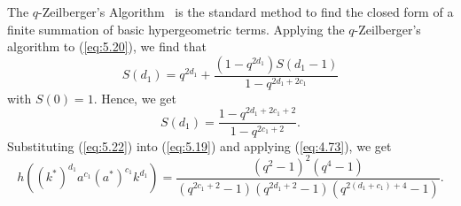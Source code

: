 \documentclass[table,a4paper,reqno]{amsart}
\numberwithin{equation}{section}
\theoremstyle{definition}
\begin{document}
The $q$-Zeilberger's Algorithm~\cite{paule1997mathematica,riese1997contributions} is the standard method to find the closed form of a finite summation of basic hypergeometric terms. Applying the $q$-Zeilberger's algorithm to (\ref{eq:5.20}), we find that 
\begin{equation}
    S(d_1)=q^{2d_1}+\frac{(1-q^{2d_1})S(d_1-1)}{1-q^{2d_1+2c_1}}
\end{equation}
with $S(0)=1$. Hence, we get
\begin{equation}\label{eq:5.22}
    S(d_1)=\frac{1-q^{2d_1+2c_1+2}}{1-q^{2c_1+2}}.
\end{equation}
Substituting (\ref{eq:5.22}) into (\ref{eq:5.19}) and applying (\ref{eq:4.73}), we get
\begin{equation}\label{eq:5.23}
    h((k^*)^{d_1}a^{c_1}(a^*)^{c_1}k^{d_1})=\frac{(q^2-1)^2(q^4-1)}{(q^{2c_1+2}-1)(q^{2d_1+2}-1)(q^{2(d_1+c_1)+4}-1)}.
\end{equation}
\end{document}
